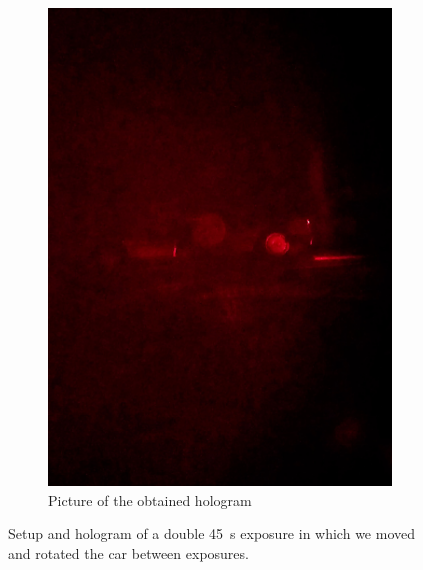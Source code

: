 \documentclass[11pt,a4paper]{article}
\begin{document}
\begin{figure}[ht]
\begin{subfigure}[b]{0.45\textwidth}
\includegraphics[width=\textwidth]{car_double_exposure_hologram}
\caption{Picture of the obtained hologram}
\label{fig:car_knight}
\end{subfigure}
\caption{Setup and hologram of a double \SI{45}{\second} exposure in which we moved and rotated the car between exposures.}
\label{fig:experiment_double_exposure}
\end{figure}

\nocite{*}


\end{document}
